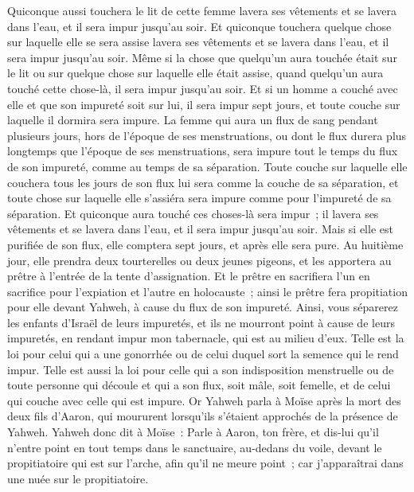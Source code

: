 \begin{multicols}{2}
Quiconque aussi touchera le lit de cette femme lavera ses vêtements et se lavera dans l'eau, et il sera impur jusqu'au soir.
Et quiconque touchera quelque chose sur laquelle elle se sera assise lavera ses vêtements et se lavera dans l'eau, et il sera impur jusqu'au soir.
Même si la chose que quelqu'un aura touchée était sur le lit ou sur quelque chose sur laquelle elle était assise, quand quelqu'un aura touché cette chose-là, il sera impur jusqu'au soir.
Et si un homme a couché avec elle et que son impureté soit sur lui, il sera impur sept jours, et toute couche sur laquelle il dormira sera impure.
La femme qui aura un flux de sang pendant plusieurs jours, hors de l'époque de ses menstruations, ou dont le flux durera plus longtemps que l'époque de ses menstruations, sera impure tout le temps du flux de son impureté, comme au temps de sa séparation.
Toute couche sur laquelle elle couchera tous les jours de son flux lui sera comme la couche de sa séparation, et toute chose sur laquelle elle s'assiéra sera impure comme pour l'impureté de sa séparation.
Et quiconque aura touché ces choses-là sera impur~; il lavera ses vêtements et se lavera dans l'eau, et il sera impur jusqu'au soir.
Mais si elle est purifiée de son flux, elle comptera sept jours, et après elle sera pure.
Au huitième jour, elle prendra deux tourterelles ou deux jeunes pigeons, et les apportera au prêtre à l'entrée de la tente d'assignation.
Et le prêtre en sacrifiera l'un en sacrifice pour l'expiation et l'autre en holocauste~; ainsi le prêtre fera propitiation pour elle devant Yahweh, à cause du flux de son impureté.
Ainsi, vous séparerez les enfants d'Israël de leurs impuretés, et ils ne mourront point à cause de leurs impuretés, en rendant impur mon tabernacle, qui est au milieu d'eux.
Telle est la loi pour celui qui a une gonorrhée ou de celui duquel sort la semence qui le rend impur.
Telle est aussi la loi pour celle qui a son indisposition menstruelle ou de toute personne qui découle et qui a son flux, soit mâle, soit femelle, et de celui qui couche avec celle qui est impure.
\VerseOne{}Or Yahweh parla à Moïse après la mort des deux fils d'Aaron, qui moururent lorsqu'ils s'étaient approchés de la présence de Yahweh.
Yahweh donc dit à Moïse~: Parle à Aaron, ton frère, et dis-lui qu'il n'entre point en tout temps dans le sanctuaire, au-dedans du voile, devant le propitiatoire qui est sur l'arche, afin qu'il ne meure point~; car j'apparaîtrai dans une nuée sur le propitiatoire.

\end{multicols}
